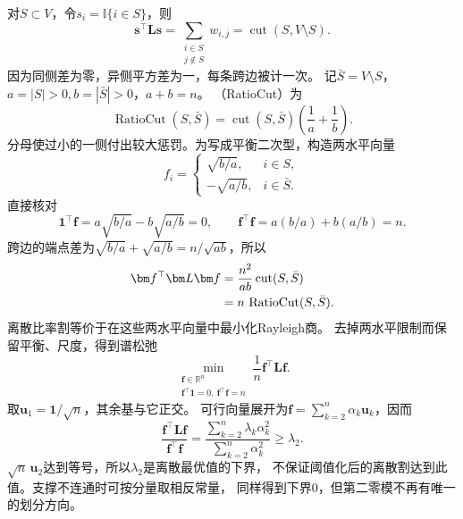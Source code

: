 对\(S\subset V\)，令\(s_i=\mathbb I\{i\in S\}\)，则
\begin{equation}
  \bm s^\top\bm L\bm s
  =\sum_{\substack{i\in S\\j\notin S}}w_{i,j}
  =\operatorname{cut}(S,V\setminus S).
  \label{eq:graph-theory-indicator-cut-energy}
\end{equation}
因为同侧差为零，异侧平方差为一，每条跨边被计一次。
记\(\bar S=V\setminus S\)，\(a=|S|>0,b=|\bar S|>0\)，\(a+b=n\)。
（RatioCut）为
\begin{equation}
  \operatorname{RatioCut}(S,\bar S)
  =\operatorname{cut}(S,\bar S)\left(\frac1a+\frac1b\right).
  \label{eq:graph-theory-ratio-cut}
\end{equation}
分母使过小的一侧付出较大惩罚。为写成平衡二次型，构造两水平向量
\begin{equation}
  f_i=
  \begin{cases}
    \sqrt{b/a},&i\in S,\\
    -\sqrt{a/b},&i\in\bar S.
  \end{cases}
  \label{eq:graph-theory-ratio-cut-balanced-vector}
\end{equation}
直接核对
\[
  \bm1^\top\bm f=a\sqrt{b/a}-b\sqrt{a/b}=0,\qquad
  \bm f^\top\bm f=a(b/a)+b(a/b)=n.
\]
跨边的端点差为\(\sqrt{b/a}+\sqrt{a/b}=n/\sqrt{ab}\)，所以
\begin{align}
  \bm f^\top\bm L\bm f
  &=\frac{n^2}{ab}\operatorname{cut}(S,\bar S)\notag\\
  &=n\,\operatorname{RatioCut}(S,\bar S).
  \label{eq:graph-theory-ratio-cut-energy}
\end{align}
离散比率割等价于在这些两水平向量中最小化Rayleigh商。
去掉两水平限制而保留平衡、尺度，得到谱松弛
\begin{equation}
  \min_{\substack{\bm f\in\mathbb R^n\\
      \bm f^\top\bm1=0,\ \bm f^\top\bm f=n}}
      \frac1n\bm f^\top\bm L\bm f.
  \label{eq:graph-theory-ratio-cut-relaxation}
\end{equation}
取\(\bm u_1=\bm1/\sqrt n\)，其余基与它正交。
可行向量展开为\(\bm f=\sum_{k=2}^n\alpha_k\bm u_k\)，因而
\[
  \frac{\bm f^\top\bm L\bm f}{\bm f^\top\bm f}
  =\frac{\sum_{k=2}^n\lambda_k\alpha_k^2}{\sum_{k=2}^n\alpha_k^2}
  \geq\lambda_2.
\]
\(\sqrt n\,\bm u_2\)达到等号，所以\(\lambda_2\)是离散最优值的下界，
不保证阈值化后的离散割达到此值。支撑不连通时可按分量取相反常量，
同样得到下界\(0\)，但第二零模不再有唯一的划分方向。

